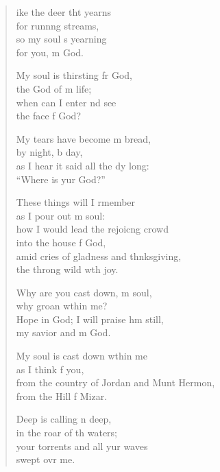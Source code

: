 \settowidth{\versewidth}{from the country of Jordan and Mount Hermon, *}
\begin{verse}%
  \begin{patverse}
ike the deer tht yearns\Med\\
for runn\pointup{\i}ng streams,\\
so my soul \pointup{\i}s yearning\Med\\
for you, m God.

My soul is thirsting fr God,\Med\\
the God of m life;\\
when can I enter nd see\Med\\
the face f God?

My tears have become m bread,\Med\\
by night, b day,\\
as I hear it said all the dy long:\Med\\
“Where is yur God?”

These things will I rmember\Med\\
as I pour out m soul:\\
how I would lead the rejoic\pointup{\i}ng crowd\Med\\
into the house f God,\\
amid cries of gladness and thnksgiving,\Med\\
the throng wild w\pointup{\i}th joy.

Why are you cast down, m soul,\Med\\
why groan w\pointup{\i}thin me?\\
Hope in God; I will praise h\pointup{\i}m still,\Med\\
my savior and m God.

My soul is cast down w\pointup{\i}thin me\Med\\
as I think f you,\\
from the country of Jordan and Munt Hermon,\Med\\
from the Hill f Mizar.

Deep is calling n deep,\Med\\
in the roar of th waters;\\
your torrents and all yur waves\Med\\
swept ovr me.


\end{patverse}
\end{verse}

